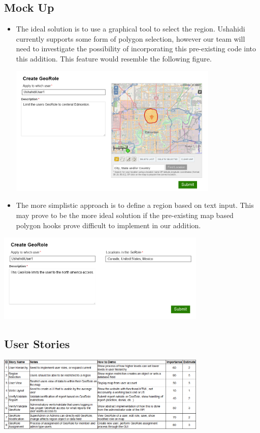 \documentclass{article}
\begin{document}
\subsection{Mock Up}
\begin{itemize}
\item The ideal solution is to use a graphical tool to select the region. Ushahidi currently supports some form of polygon selection, however our team will need to investigate the possibility of incorporating this pre-existing code into this addition. This feature would resemble the following figure.
\begin{minipage}{\linewidth}
  \centering
  \includegraphics[width=100mm]{mockupMap.png}
\end{minipage}
\item The more simplistic approach is to define a region based on text input. This may prove to be the more ideal solution if the pre-existing map based polygon hooks prove difficult to implement in our addition.
\end{itemize}
\begin{minipage}{\linewidth}
  \centering
  \includegraphics[width=100mm]{mockupNomap.png}
\end{minipage}

\subsection{User Stories}
\begin{minipage}{\linewidth}
  \centering
  \includegraphics[width=100mm]{ProjectBacklogImage.png}
\end{minipage}
\end{document}
